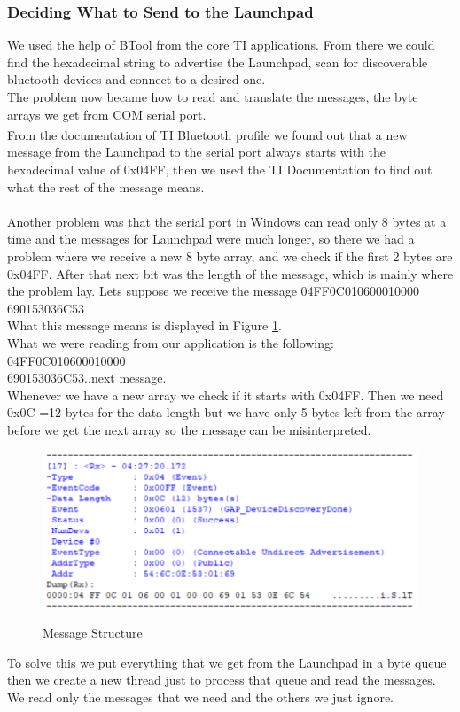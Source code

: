 \documentclass[hidelinks,conference,12pt]{IEEETran}
\begin{document}
\subsubsection{Deciding What to Send to the Launchpad}
We used the help of BTool from the core TI applications. From there we could find the hexadecimal string to advertise the Launchpad, scan for discoverable bluetooth devices and connect to a desired one.\\
The problem now became how to read and translate the messages, the byte arrays we get from COM serial port.\\
From the documentation of TI Bluetooth profile\textsuperscript{\cite{vendor}} we found out that a new message from the Launchpad to the serial port always starts with the hexadecimal value of 0x04FF, then we used the TI Documentation to find out what the rest of the message means.\\\\
Another problem was that the serial port in Windows can read only 8 bytes at a time and the messages for Launchpad were much longer, so there we had a problem where we receive a new 8 byte array, and we check if the first 2 bytes are 0x04FF. After that next bit was the length of the message, which is mainly where the problem lay. Lets suppose we receive the message 04FF0C010600010000 690153036C53\\
What this message means is displayed in Figure \ref{img:msgstruct}.\\
What we were reading from our application is the following:\\
04FF0C010600010000\\
690153036C53..next message.\\
Whenever we have a new array we check if it starts with 0x04FF. Then we need 0x0C =12 bytes for the data length but we have only 5  bytes left from the array before we get the next array so the message can be misinterpreted.
\FloatBarrier
\begin{figure}[!h]
	\centering
	\caption{Message Structure}
	\includegraphics[scale=0.3]{images/msgstruct.png}
	\label{img:msgstruct}
\end{figure}
\FloatBarrier
To solve this we put everything that we get from the Launchpad in a byte queue then we create a new thread just to process that queue and read the messages. We read only the messages that we need and the others we just ignore.
\end{document}
